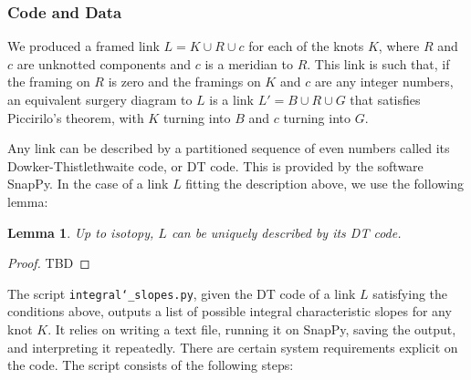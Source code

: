 \documentclass[11pt,usenames,dvipsnames,reqno]{amsart}
\numberwithin{theorem}{section}
\newtheorem{lemma}[theorem]{Lemma}
\theoremstyle{ex}
\theoremstyle{rem}
\begin{document}
\subsubsection{Code and Data}
We produced a framed link $L = K \cup R \cup c$ for each of the knots $K$, where $R$ and $c$ are unknotted components and $c$ is a meridian to $R$. This link is such that, if the framing on $R$ is zero and the framings on $K$ and $c$ are any integer numbers, an equivalent surgery diagram to $L$ is a link $L' = B \cup R \cup G$ that satisfies Piccirilo's theorem, with $K$ turning into $B$ and $c$ turning into $G$.

Any link can be described by a partitioned sequence of even numbers called its Dowker-Thistlethwaite  code, or DT code. This is provided by the software SnapPy. In the case of a link $L$ fitting the description above, we use the following lemma:

\begin{lemma}
	Up to isotopy, $L$ can be uniquely described by its DT code.
\end{lemma}
\begin{proof}
	TBD
\end{proof}

The script \texttt{integral\char`_slopes.py}, given the DT code of a link $L$ satisfying the conditions above, outputs a list of possible integral characteristic slopes for any knot $K$. It relies on writing a text file, running it on SnapPy, saving the output, and interpreting it repeatedly. There are certain system requirements explicit on the code. The script consists of the following steps:
\end{document}
